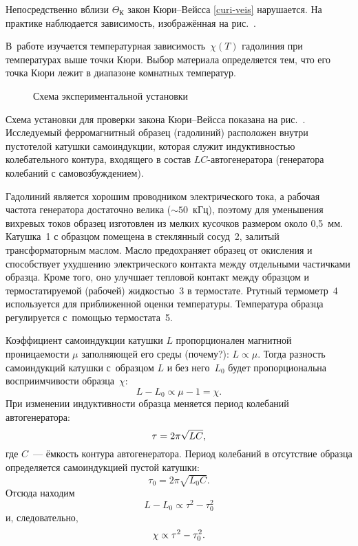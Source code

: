 
Непосредственно вблизи $\Theta_К$ закон Кюри--Вейсса
\eqref{curi-veis} нарушается. На практике наблюдается зависимость, изображённая
на рис.~.

\experiment

В~работе изучается температурная зависимость~$\chi(T)$ гадолиния при
температурах выше точки Кюри. Выбор материала определяется тем, что его точка
Кюри лежит в диапазоне комнатных температур.

\begin{figure}[h!]
    \centering\small
    \caption{Схема экспериментальной установки}
\end{figure}

Схема установки для проверки закона Кюри--Вейсса показана на рис.~.
Исследуемый ферромагнитный образец (гадолиний) расположен внутри пустотелой
катушки самоиндукции, которая служит индуктивностью колебательного контура,
входящего в состав $LC$-авто\-генератора (генератора колебаний с
самовозбуждением).

Гадолиний является хорошим проводником электрического тока, а рабочая частота
генератора достаточно велика (${\sim}50$~кГц), поэтому для уменьшения вихревых
токов образец изготовлен из мелких кусочков размером около 0,5~мм.
Катушка~1 с образцом помещена в стеклянный сосуд~2, залитый трансформаторным
маслом. Масло предохраняет образец от окисления и способствует ухудшению
электрического контакта между отдельными частичками образца. Кроме того, оно
улучшает тепловой контакт между образцом и термостатируемой (рабочей)
жидкостью~3 в термостате. Ртутный термометр~4 используется для приближенной
оценки температуры. Температура образца регулируется с~помощью термостата~5.

Коэффициент самоиндукции катушки $L$ пропорционален магнитной
проницаемости $\mu$ заполняющей его среды (почему?): $L\propto \mu$.
Тогда разность самоиндукций катушки с~образцом $L$ и без него~$L_0$
будет пропорциональна восприимчивости образца~$\chi$:
\begin{equation*}%
	L-L_0\propto \mu - 1 = \chi.
\end{equation*}
При изменении индуктивности образца меняется период колебаний автогенератора:
\begin{equation*}%
	\tau=2\pi\sqrt{LC},
	\eqmark{4}
\end{equation*}
где $C$~--- ёмкость контура автогенератора.
Период колебаний в отсутствие образца определяется самоиндукцией пустой катушки:
\begin{equation*}
	\tau_0=2\pi\sqrt{L_0 C}.
\end{equation*}
Отсюда находим
\begin{equation*}
	L-L_0 \propto \tau^2-\tau_0^2
\end{equation*}
и, следовательно,
\begin{equation}%
	\eqmark{6}
	\chi\propto \tau^2-\tau_0^2.
\end{equation}

